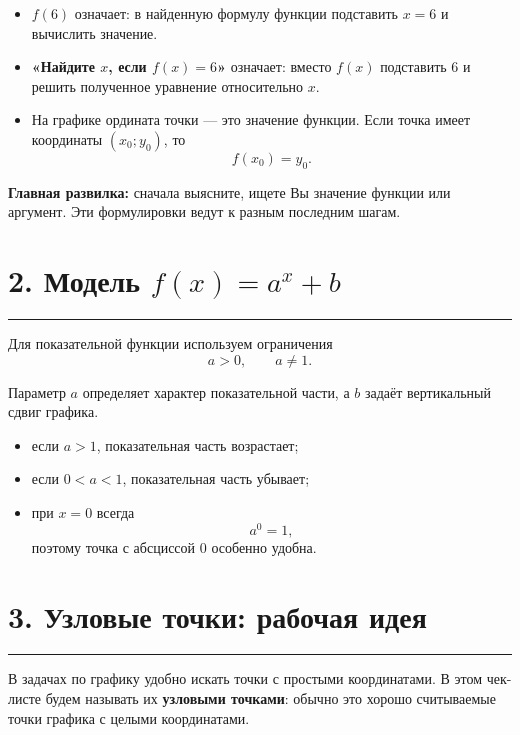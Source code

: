 \documentclass[a4paper,12pt]{article}
\newcommand{\sectionline}{%
  \vspace{-0.2em}
  \textcolor{accent}{\rule{\linewidth}{0.5pt}}
  \vspace{0.25em}
}
\newcommand{\key}[1]{\textbf{\textcolor{darkaccent}{#1}}}
\begin{document}
\begin{itemize}

  \item
  \key{$f(6)$} означает: в найденную формулу функции подставить
  $x=6$ и вычислить значение.

  \item
  \key{«Найдите $x$, если $f(x)=6$»} означает:
  вместо $f(x)$ подставить $6$ и решить полученное уравнение
  относительно $x$.

  \item
  На графике ордината точки --- это значение функции.
  Если точка имеет координаты $(x_0;y_0)$, то
  \[
      f(x_0)=y_0.
  \]

\end{itemize}

\key{Главная развилка:}
сначала выясните, ищете Вы значение функции или аргумент.
Эти формулировки ведут к разным последним шагам.


\section*{2. Модель $f(x)=a^x+b$}
\sectionline

Для показательной функции используем ограничения
\[
    a>0,
    \qquad
    a\ne 1.
\]

Параметр $a$ определяет характер показательной части,
а $b$ задаёт вертикальный сдвиг графика.

\begin{itemize}

  \item
  если $a>1$, показательная часть возрастает;

  \item
  если $0<a<1$, показательная часть убывает;

  \item
  при $x=0$ всегда
  \[
      a^0=1,
  \]
  поэтому точка с абсциссой $0$ особенно удобна.

\end{itemize}


\section*{3. Узловые точки: рабочая идея}
\sectionline

В задачах по графику удобно искать точки с простыми координатами.
В этом чек-листе будем называть их
\key{узловыми точками}:
обычно это хорошо считываемые точки графика с целыми координатами.
\end{document}
